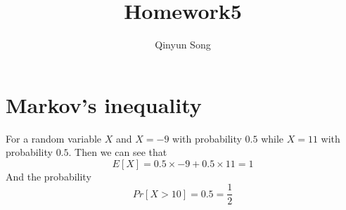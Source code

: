 \documentclass{article}
\title{Homework5}
\author{Qinyun Song}
\date{}
\begin{document}
	\maketitle

	\section{Markov's inequality}
		For a random variable $X$ and $X = -9$ with probability $0.5$ while $X = 11$ with probability $0.5$. Then we can see that \begin{equation}
		E[X] = 0.5 \times -9 + 0.5 \times 11 = 1
		\end{equation}
		And the probability \begin{equation}
			Pr \left[ X >  10 \right] = 0.5 = \frac{1}{2}
			\end{equation}
\end{document}
